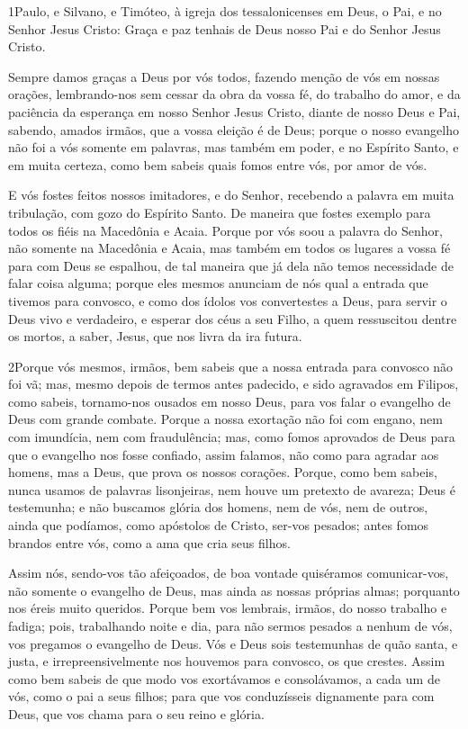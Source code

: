 
\lettrine{1} Paulo, e Silvano, e Timóteo, à igreja dos
tessalonicenses em Deus, o Pai, e no Senhor Jesus Cristo: Graça e
paz tenhais de Deus nosso Pai e do Senhor Jesus Cristo.

Sempre damos graças a Deus por vós todos, fazendo menção de vós em
nossas orações, lembrando-nos sem cessar da obra da vossa fé, do
trabalho do amor, e da paciência da esperança em nosso Senhor Jesus
Cristo, diante de nosso Deus e Pai, sabendo, amados irmãos, que
a vossa eleição é de Deus; porque o nosso evangelho não foi a
vós somente em palavras, mas também em poder, e no Espírito Santo, e
em muita certeza, como bem sabeis quais fomos entre vós, por amor de
vós.

E vós fostes feitos nossos imitadores, e do Senhor, recebendo a
palavra em muita tribulação, com gozo do Espírito Santo. De
maneira que fostes exemplo para todos os fiéis na Macedônia e Acaia.
Porque por vós soou a palavra do Senhor, não somente na
Macedônia e Acaia, mas também em todos os lugares a vossa fé para
com Deus se espalhou, de tal maneira que já dela não temos
necessidade de falar coisa alguma; porque eles mesmos anunciam
de nós qual a entrada que tivemos para convosco, e como dos ídolos
vos convertestes a Deus, para servir o Deus vivo e verdadeiro,
e esperar dos céus a seu Filho, a quem ressuscitou dentre os
mortos, a saber, Jesus, que nos livra da ira futura.

\medskip

\lettrine{2} Porque vós mesmos, irmãos, bem sabeis que a nossa
entrada para convosco não foi vã; mas, mesmo depois de termos
antes padecido, e sido agravados em Filipos, como sabeis,
tornamo-nos ousados em nosso Deus, para vos falar o evangelho de
Deus com grande combate. Porque a nossa exortação não foi com
engano, nem com imundícia, nem com fraudulência; mas, como fomos
aprovados de Deus para que o evangelho nos fosse confiado, assim
falamos, não como para agradar aos homens, mas a Deus, que prova os
nossos corações. Porque, como bem sabeis, nunca usamos de
palavras lisonjeiras, nem houve um pretexto de avareza; Deus é
testemunha; e não buscamos glória dos homens, nem de vós, nem de
outros, ainda que podíamos, como apóstolos de Cristo, ser-vos
pesados; antes fomos brandos entre vós, como a ama que cria seus
filhos.

Assim nós, sendo-vos tão afeiçoados, de boa vontade quiséramos
comunicar-vos, não somente o evangelho de Deus, mas ainda as nossas
próprias almas; porquanto nos éreis muito queridos. Porque bem
vos lembrais, irmãos, do nosso trabalho e fadiga; pois, trabalhando
noite e dia, para não sermos pesados a nenhum de vós, vos pregamos o
evangelho de Deus. Vós e Deus sois testemunhas de quão santa,
e justa, e irrepreensivelmente nos houvemos para convosco, os que
crestes. Assim como bem sabeis de que modo vos exortávamos e
consolávamos, a cada um de vós, como o pai a seus filhos;
para que vos conduzísseis dignamente para com Deus, que vos
chama para o seu reino e glória.

